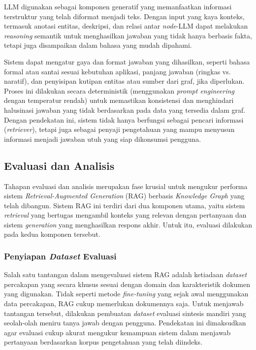 LLM digunakan sebagai komponen generatif yang memanfaatkan informasi terstruktur yang telah diformat menjadi teks.
Dengan input yang kaya konteks, termasuk anotasi entitas, deskripsi, dan relasi antar \textit{node}-LLM dapat melakukan \textit{reasoning} semantik untuk menghasilkan jawaban yang tidak hanya berbasis fakta, tetapi juga disampaikan dalam bahasa yang mudah dipahami.

Sistem dapat mengatur gaya dan format jawaban yang dihasilkan, seperti bahasa formal atau santai sesuai kebutuhan aplikasi, panjang jawaban (ringkas vs. naratif), dan penyisipan kutipan entitas atau sumber dari graf, jika diperlukan.
Proses ini dilakukan secara deterministik (menggunakan \textit{prompt engineering} dengan temperatur rendah) untuk memastikan konsistensi dan menghindari halusinasi jawaban yang tidak berdasarkan pada data yang tersedia dalam graf.
Dengan pendekatan ini, sistem tidak hanya berfungsi sebagai pencari informasi (\textit{retriever}), tetapi juga sebagai penyaji pengetahuan yang mampu menyusun informasi menjadi jawaban utuh yang siap dikonsumsi pengguna.

\subsection{Evaluasi dan Analisis}
Tahapan evaluasi dan analisis merupakan fase krusial untuk mengukur performa sistem \textit{Retrieval-Augmented Generation} (RAG) berbasis \textit{Knowledge Graph} yang telah dibangun.
Sistem RAG ini terdiri dari dua komponen utama, yaitu sistem \textit{retrieval} yang bertugas mengambil konteks yang relevan dengan pertanyaan dan sistem \textit{generation} yang menghasilkan respons akhir.
Untuk itu, evaluasi dilakukan pada kedua komponen tersebut.

\subsubsection{Penyiapan \textit{Dataset} Evaluasi}
Salah satu tantangan dalam mengevaluasi sistem RAG adalah ketiadaan \textit{dataset} percakapan yang secara khusus sesuai dengan domain dan karakteristik dokumen yang digunakan.
Tidak seperti metode \textit{fine-tuning} yang sejak awal menggunakan data percakapan, RAG cukup memerlukan dokumennya saja.
Untuk menjawab tantangan tersebut, dilakukan pembuatan \textit{dataset} evaluasi sintesis mandiri yang seolah-olah meniru tanya jawab dengan pengguna.
Pendekatan ini dimaksudkan agar evaluasi cukup akurat mengukur kemampuan sistem dalam menjawab pertanyaan berdasarkan korpus pengetahuan yang telah diindeks.

